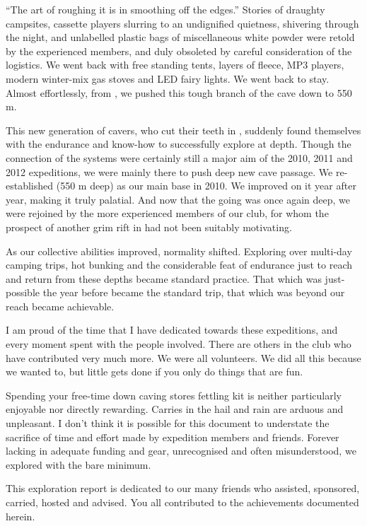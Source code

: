 ``The art of roughing it is in smoothing off the edges.'' Stories of draughty campsites, cassette players slurring to an undignified quietness, shivering through the night, and unlabelled plastic bags of miscellaneous white powder were retold by the experienced members, and duly obsoleted by careful consideration of the logistics. We went back with free standing tents, layers of fleece, MP3 players, modern winter-mix gas stoves and LED fairy lights. We went back to stay. Almost effortlessly, from , we pushed this tough branch of the cave down to 550 m.

This new generation of cavers, who cut their teeth in ,
suddenly found themselves with the endurance and know-how to
successfully explore at depth. Though the connection of the systems were
certainly still a major aim of the 2010, 2011 and 2012 expeditions, we were
mainly there to push deep new cave passage. We re-established  (550 m deep) as our main base in 2010. We improved on it year after
year, making it truly palatial. And now that the going was once again
deep, we were rejoined by the more experienced members of our club, for
whom the prospect of another grim rift in  had not been
suitably motivating.

As our collective abilities improved, normality shifted. Exploring over
multi-day camping trips, hot bunking and the considerable feat of
endurance just to reach and return from these depths became standard
practice. That which was just-possible the year before became the
standard trip, that which was beyond our reach became achievable.

I am proud of the time that I have dedicated towards these expeditions,
and every moment spent with the people involved. There are others in the
club who have contributed very much more. We were all volunteers. We did
all this because we wanted to, but little gets done if you only do
things that are fun.

Spending your free-time down caving stores fettling kit is neither
particularly enjoyable nor directly rewarding. Carries in the hail and
rain are arduous and unpleasant. I don't think it is possible for this
document to understate the sacrifice of time and effort made by
expedition members and friends. Forever lacking in adequate funding and
gear, unrecognised and often misunderstood, we explored with the bare
minimum.

This exploration report is dedicated to our many friends who assisted,
sponsored, carried, hosted and advised. You all contributed to the
achievements documented herein.

